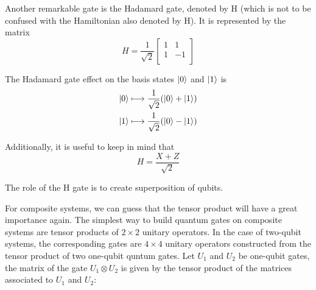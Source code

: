 Another remarkable gate is the Hadamard gate, denoted by H (which is not to be confused with the Hamiltonian also denoted by H). It is represented by the matrix
\begin{equation}
    H = \frac{1}{\sqrt{2}}\begin{bmatrix}
        1&1\\
        1&-1\\
        \end{bmatrix} 
\end{equation}

The Hadamard gate effect on the basis states $\ket{0}$ and $\ket{1}$ is 
\begin{align}
    \ket{0} &\longmapsto \frac{1}{\sqrt{2}}(\ket{0} + \ket{1}) \\
    \ket{1} &\longmapsto \frac{1}{\sqrt{2}}(\ket{0} - \ket{1})
\end{align}

Additionally, it is useful to keep in mind that
$$H = \frac{X+Z}{\sqrt{2}}$$

The role of the H gate is to create superposition of qubits.

For composite systems, we can guess that the tensor product will have a great importance again. The simplest way to build quantum gates on composite systems are tensor products of $2 \times 2$ unitary operators. In the case of two-qubit systems, the corresponding gates are $4 \times 4$ unitary operators constructed from the tensor product of two one-qubit quntum gates. Let $U_1$ and $U_2$ be one-qubit gates, the matrix of the gate $U_1 \otimes U_2$ is given by the tensor product of the matrices associated to $U_1$ and $U_2$:

